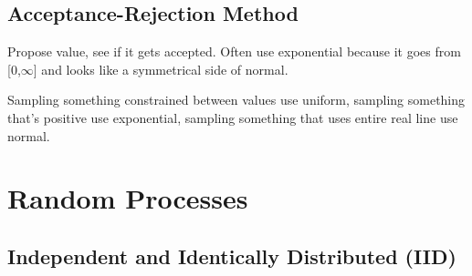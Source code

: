 \documentclass{report}
\newcommand{\ex}{\noindent\rule{\linewidth}{0.2pt}}
\begin{document}
\subsection{Acceptance-Rejection Method}

Propose value, see if it gets accepted. Often use exponential because it goes from [0,$\infty$] and looks like a symmetrical side of normal.

Sampling something constrained between values use uniform, sampling something that's positive use exponential, sampling something that uses entire real line use normal.























\section{Random Processes}

\subsection{Independent and Identically Distributed (IID)}
\end{document}
